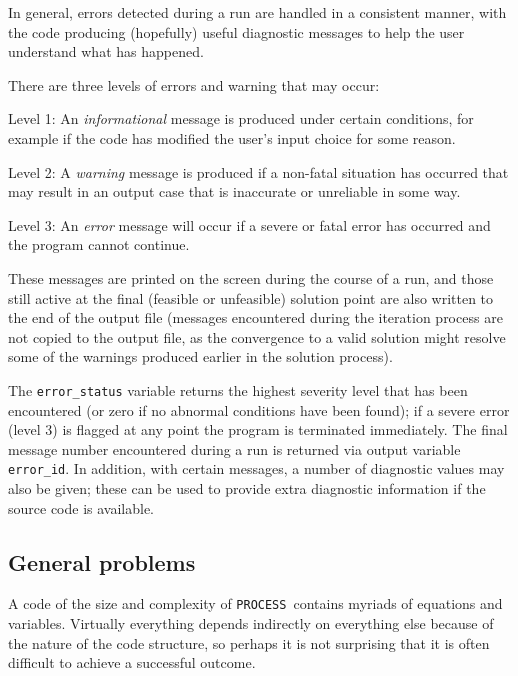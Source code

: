 \documentclass[11pt,a4paper]{report}
\newcommand{\process}{\mbox{\texttt{PROCESS}}}
\begin{document}
In general, errors detected during a run are handled in a consistent manner,
with the code producing (hopefully) useful diagnostic messages to help the
user understand what has happened.

There are three levels of errors and warning that may occur:
\begin{description}

\item{Level 1:} An \textit{informational}\/ message is produced under certain
  conditions, for example if the code has modified the user's input choice for
  some reason.

\item{Level 2:} A \textit{warning}\/ message is produced if a non-fatal situation has
  occurred that may result in an output case that is inaccurate or
  unreliable in some way.

\item{Level 3:} An \textit{error}\/ message will occur if a severe or fatal
  error has occurred and the program cannot continue.

\end{description}

These messages are printed on the screen during the course of a run, and those
still active at the final (feasible or unfeasible) solution point are also
written to the end of the output file (messages encountered during the
iteration process are not copied to the output file, as the convergence to a
valid solution might resolve some of the warnings produced earlier in the
solution process).

The \texttt{error\_status} variable returns the highest severity level that
has been encountered (or zero if no abnormal conditions have been found); if a
severe error (level 3) is flagged at any point the program is terminated
immediately. The final message number encountered during a run is returned via
output variable \texttt{error\_id}. In addition, with certain messages, a
number of diagnostic values may also be given; these can be used to provide
extra diagnostic information if the source code is available.

\subsection{General problems}

A code of the size and complexity of \process\ contains myriads of equations
and variables. Virtually everything depends indirectly on everything else
because of the nature of the code structure, so perhaps it is not surprising
that it is often difficult to achieve a successful outcome.
\end{document}
